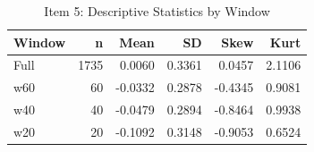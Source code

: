\begin{table}

\caption{\label{tab:export_latex_tables}Item 5: Descriptive Statistics by Window}
\centering
\begin{tabular}[t]{lrrrrr}
\toprule
Window & n & Mean & SD & Skew & Kurt\\
\midrule
Full & 1735 & 0.0060 & 0.3361 & 0.0457 & 2.1106\\
w60 & 60 & -0.0332 & 0.2878 & -0.4345 & 0.9081\\
w40 & 40 & -0.0479 & 0.2894 & -0.8464 & 0.9938\\
w20 & 20 & -0.1092 & 0.3148 & -0.9053 & 0.6524\\
\bottomrule
\end{tabular}
\end{table}
